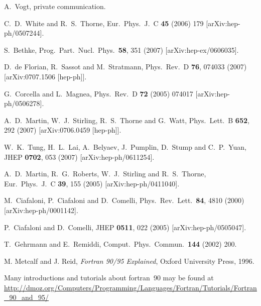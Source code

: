 \documentclass[12pt]{article}
\begin{document}
\begin{thebibliography}{99}
 A.~Vogt, private communication.


  C.~D.~White and R.~S.~Thorne,
  Eur.\ Phys.\ J.\ C {\bf 45} (2006) 179
  [arXiv:hep-ph/0507244].

  S.~Bethke,
  Prog.\ Part.\ Nucl.\ Phys.\  {\bf 58}, 351 (2007)
  [arXiv:hep-ex/0606035].

  D.~de Florian, R.~Sassot and M.~Stratmann,
  Phys.\ Rev.\  D {\bf 76}, 074033 (2007)
  [arXiv:0707.1506 [hep-ph]].


  G.~Corcella and L.~Magnea,
  Phys.\ Rev.\  D {\bf 72} (2005) 074017
  [arXiv:hep-ph/0506278].

  A.~D.~Martin, W.~J.~Stirling, R.~S.~Thorne and G.~Watt,
  Phys.\ Lett.\  B {\bf 652}, 292 (2007)
  [arXiv:0706.0459 [hep-ph]].

  W.~K.~Tung, H.~L.~Lai, A.~Belyaev, J.~Pumplin, D.~Stump and C.~P.~Yuan,
  JHEP {\bf 0702}, 053 (2007)
  [arXiv:hep-ph/0611254].

  A.~D.~Martin, R.~G.~Roberts, W.~J.~Stirling and R.~S.~Thorne,
  Eur.\ Phys.\ J.\  C {\bf 39}, 155 (2005)
  [arXiv:hep-ph/0411040].

  M.~Ciafaloni, P.~Ciafaloni and D.~Comelli,
  Phys.\ Rev.\ Lett.\  {\bf 84}, 4810 (2000)
  [arXiv:hep-ph/0001142].


  P.~Ciafaloni and D.~Comelli,
  JHEP {\bf 0511}, 022 (2005)
  [arXiv:hep-ph/0505047].


  T.~Gehrmann and E.~Remiddi,
  Comput.\ Phys.\ Commun.\  {\bf 144} (2002) 200.

  M. Metcalf and J. Reid, \emph{Fortran 90/95 Explained}, Oxford
  University Press, 1996.

 Many introductions and tutorials about
  fortran~90 may be found at
  \url{http://dmoz.org/Computers/Programming/Languages/Fortran/Tutorials/Fortran_90_and_95/}

\end{thebibliography}





\end{document}
